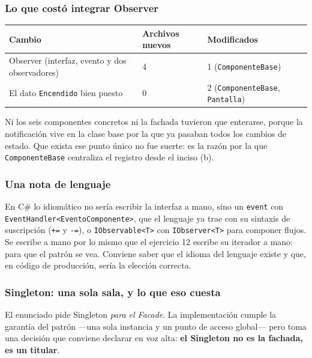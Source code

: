 \subsubsection*{Lo que costó integrar Observer}

\begin{table}[h!]
    \centering
    \small
    \begin{tabular}{p{7.0cm}p{3.2cm}p{3.6cm}}
        \toprule
        \textbf{Cambio} & \textbf{Archivos nuevos} & \textbf{Modificados} \\
        \midrule
        Observer (interfaz, evento y dos observadores) & 4 & 1
          (\texttt{ComponenteBase}) \\
        \addlinespace
        El dato \texttt{Encendido} bien puesto & 0 & 2 (\texttt{ComponenteBase},
          \texttt{Pantalla}) \\
        \bottomrule
    \end{tabular}
\end{table}

Ni los seis componentes concretos ni la fachada tuvieron que enterarse, porque la notificación
vive en la clase base por la que ya pasaban todos los cambios de estado. Que exista ese punto
único no fue suerte: es la razón por la que \texttt{ComponenteBase} centraliza el registro
desde el inciso (b).

\subsubsection*{Una nota de lenguaje}

En C\# lo idiomático no sería escribir la interfaz a mano, sino un \texttt{event} con
\texttt{EventHandler<EventoComponente>}, que el lenguaje ya trae con su sintaxis de
suscripción (\texttt{+=} y \texttt{-=}), o \texttt{IObservable<T>} con \texttt{IObserver<T>}
para componer flujos. Se escribe a mano por lo mismo que el ejercicio 12 escribe su iterador a
mano: para que el patrón se vea. Conviene saber que el idioma del lenguaje existe y que, en
código de producción, sería la elección correcta.

\subsubsection*{Singleton: una sola sala, y lo que eso cuesta}

El enunciado pide Singleton \emph{para el Facade}. La implementación cumple la garantía del
patrón —una sola instancia y un punto de acceso global— pero toma una decisión que conviene
declarar en voz alta: \textbf{el Singleton no es la fachada, es un titular}.


